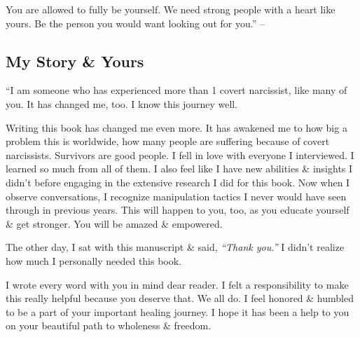 \documentclass{article}
\numberwithin{equation}{section}
\begin{document}
You are allowed to fully be yourself. We need strong people with a heart like yours. Be the person you would want looking out for you.'' -- \cite[pp. 168--169]{Mirza2017}

\subsection{My Story \& Yours}
``I am someone who has experienced more than 1 covert narcissist, like many of you. It has changed me, too. I know this journey well.

Writing this book has changed me even more. It has awakened me to how big a problem this is worldwide, how many people are suffering because of covert narcissists. Survivors are good people. I fell in love with everyone I interviewed. I learned so much from all of them. I also feel like I have new abilities \& insights I didn't before engaging in the extensive research I did for this book. Now when I observe conversations, I recognize manipulation tactics I never would have seen through in previous years. This will happen to you, too, as you educate yourself \& get stronger. You will be amazed \& empowered.

The other day, I sat with this manuscript \& said, \textit{``Thank you.''} I didn't realize how much I personally needed this book.

I wrote every word with you in mind dear reader. I felt a responsibility to make this really helpful because you deserve that. We all do. I feel honored \& humbled to be a part of your important healing journey. I hope it has been a help to you on your beautiful path to wholeness \& freedom.
\end{document}
